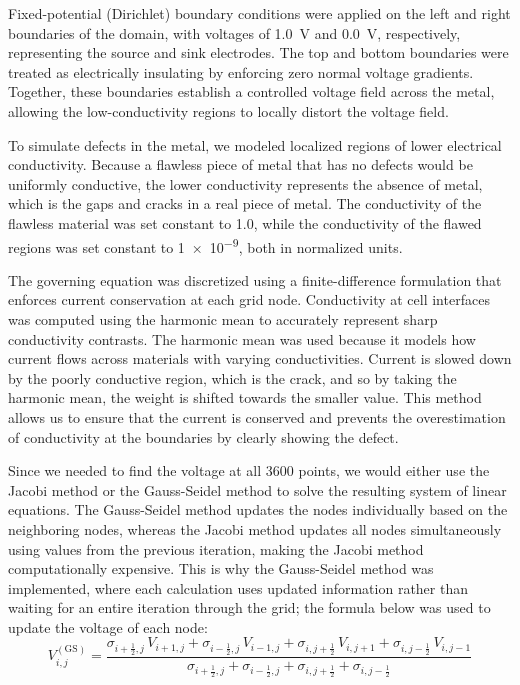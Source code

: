 \documentclass[10pt,journal,twoside]{IEEEtran} %
\begin{document}
Fixed-potential (Dirichlet) boundary conditions were applied on the left and right boundaries of the domain, with voltages of \qty{1.0}{\volt} and \qty{0.0}{\volt}, respectively, representing the source and sink electrodes. The top and bottom boundaries were treated as electrically insulating by enforcing zero normal voltage gradients. Together, these boundaries establish a controlled voltage field across the metal, allowing the low-conductivity regions to locally distort the voltage field.

To simulate defects in the metal, we modeled localized regions of lower electrical conductivity. Because a flawless piece of metal that has no defects would be uniformly conductive, the lower conductivity represents the absence of metal, which is the gaps and cracks in a real piece of metal. The conductivity of the flawless material was set constant to \num{1.0}, while the conductivity of the flawed regions was set constant to \num{1e-9}, both in normalized units. 

The governing equation was discretized using a finite-difference formulation that enforces current conservation at each grid node. Conductivity at cell interfaces was computed using the harmonic mean to accurately represent sharp conductivity contrasts. The harmonic mean was used because it models how current flows across materials with varying conductivities. Current is slowed down by the poorly conductive region, which is the crack, and so by taking the harmonic mean, the weight is shifted towards the smaller value. This method allows us to ensure that the current is conserved and prevents the overestimation of conductivity at the boundaries by clearly showing the defect. 

Since we needed to find the voltage at all 3600 points, we would either use the Jacobi method or the Gauss-Seidel \cite{press:1992:numerical} method to solve the resulting system of linear equations. The Gauss-Seidel method updates the nodes individually based on the neighboring nodes, whereas the Jacobi method updates all nodes simultaneously using values from the previous iteration, making the Jacobi method computationally expensive. This is why the Gauss-Seidel method was implemented, where each calculation uses updated information rather than waiting for an entire iteration through the grid; the formula below was used to update the voltage of each node:
\begin{equation} 
V_{i,j}^{(\mathrm{GS})} = \frac{\sigma_{i+\frac{1}{2},j} \, V_{i+1,j} + \sigma_{i-\frac{1}{2},j} \, V_{i-1,j} + \sigma_{i,j+\frac{1}{2}} \, V_{i,j+1} + \sigma_{i,j-\frac{1}{2}} \, V_{i,j-1}}{\sigma_{i+\frac{1}{2},j} + \sigma_{i-\frac{1}{2},j} + \sigma_{i,j+\frac{1}{2}} + \sigma_{i,j-\frac{1}{2}}}
\label{eq:Gauss-Seidel update formula}
\end{equation}
\end{document}
